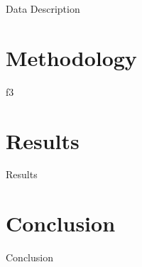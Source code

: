 \documentclass[12pt]{beamer}
\begin{document}


\begin{frame}{Data Description}

\end{frame}




\section{Methodology}
\begin{frame}{f3}

\end{frame}


\section{Results}

\begin{frame}{Results}


\end{frame}

\section{Conclusion}

\begin{frame}{Conclusion}


\end{frame}

\end{document}
